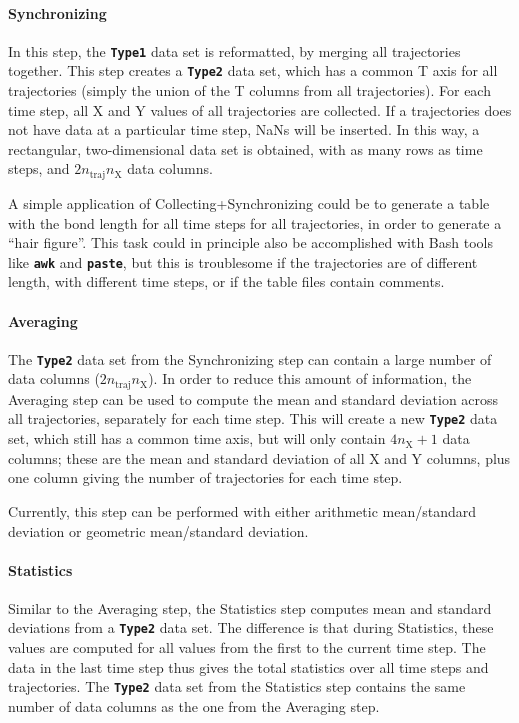 \documentclass[a4paper,10pt,DIV=15,openany,twoside=false]{scrbook}
\newcommand{\ttt}[1]{\textbf{\texttt{#1}}}
\begin{document}
\paragraph{Synchronizing}

In this step, the \ttt{Type1} data set is reformatted, by merging all trajectories together.
This step creates a \ttt{Type2} data set, which has a common T axis for all trajectories (simply the union of the T columns from all trajectories).
For each time step, all X and Y values of all trajectories are collected.
If a trajectories does not have data at a particular time step, NaNs will be inserted.
In this way, a rectangular, two-dimensional data set is obtained, with as many rows as time steps, and $2n_\text{traj}n_\text{X}$ data columns.

A simple application of Collecting+Synchronizing could be to generate a table with the bond length for all time steps for all trajectories, in order to generate a ``hair figure''.
This task could in principle also be accomplished with Bash tools like \ttt{awk} and \ttt{paste}, but this is troublesome if the trajectories are of different length, with different time steps, or if the table files contain comments.

\paragraph{Averaging}

The \ttt{Type2} data set from the Synchronizing step can contain a large number of data columns ($2n_\text{traj}n_\text{X}$).
In order to reduce this amount of information, the Averaging step can be used to compute the mean and standard deviation across all trajectories, separately for each time step.
This will create a new \ttt{Type2} data set, which still has a common time axis, but will only contain $4n_\text{X}+1$ data columns; these are the mean and standard deviation of all X and Y columns, plus one column giving the number of trajectories for each time step.

Currently, this step can be performed with either arithmetic mean/standard deviation or geometric mean/standard deviation.

\paragraph{Statistics}

Similar to the Averaging step, the Statistics step computes mean and standard deviations from a \ttt{Type2} data set.
The difference is that during Statistics, these values are computed for all values from the first to the current time step.
The data in the last time step thus gives the total statistics over all time steps and trajectories.
The \ttt{Type2} data set from the Statistics step  contains the same number of data columns as the one from the Averaging step.
\end{document}
